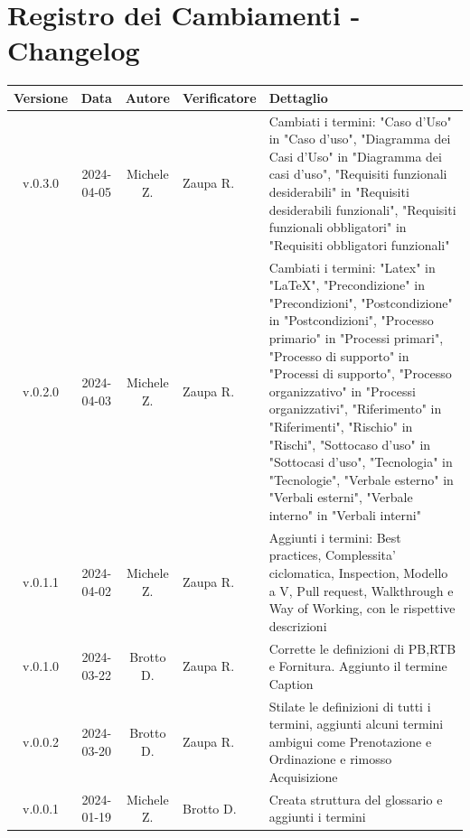 \documentclass[12pt, oneside]{article}
\begin{document}
\section*{Registro dei Cambiamenti - Changelog}
\begin{tabular}{|c|c|c|p{3cm}|p{6cm}|}
\hline
\textbf{Versione} & \textbf{Data} & \textbf{Autore} & \textbf{Verificatore} & \textbf{Dettaglio} \\
\hline
v.0.3.0 & 2024-04-05 & Michele Z. & Zaupa R. & Cambiati i termini: "Caso d'Uso" in "Caso d'uso", "Diagramma dei Casi d'Uso" in "Diagramma dei casi d'uso", "Requisiti funzionali desiderabili" in "Requisiti desiderabili funzionali", "Requisiti funzionali obbligatori" in "Requisiti obbligatori funzionali"\\
\hline
v.0.2.0 & 2024-04-03 & Michele Z. & Zaupa R. & Cambiati i termini: "Latex" in "LaTeX", "Precondizione" in "Precondizioni", "Postcondizione" in "Postcondizioni", "Processo primario" in "Processi primari", "Processo di supporto" in "Processi di supporto", "Processo organizzativo" in "Processi organizzativi", "Riferimento" in "Riferimenti", "Rischio" in "Rischi", "Sottocaso d'uso" in "Sottocasi d'uso", "Tecnologia" in "Tecnologie", "Verbale esterno" in "Verbali esterni", "Verbale interno" in "Verbali interni"\\
\hline
v.0.1.1 & 2024-04-02 & Michele Z. & Zaupa R. & Aggiunti i termini: Best practices, Complessita' ciclomatica, Inspection, Modello a V, Pull request, Walkthrough e Way of Working, con le rispettive descrizioni\\
\hline
v.0.1.0 & 2024-03-22 & Brotto D. & Zaupa R. & Corrette le definizioni di PB,RTB e Fornitura. Aggiunto il termine Caption\\
\hline
v.0.0.2 & 2024-03-20 & Brotto D. & Zaupa R. & Stilate le definizioni di tutti i termini, aggiunti alcuni termini ambigui come Prenotazione e Ordinazione e rimosso Acquisizione \\
\hline
v.0.0.1 & 2024-01-19 & Michele Z. & Brotto D. & Creata struttura del glossario e aggiunti i termini \\
\hline
\end{tabular}
\newpage

\tableofcontents
\newpage
\end{document}
